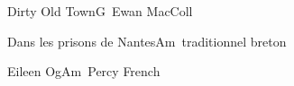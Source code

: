 \begin{song}{Dirty Old Town}{G}{~}{Ewan MacColl}{}{}
	
\end{song}

\begin{song}{Dans les prisons de Nantes}{Am}{~}{traditionnel breton}{}{}
	
\end{song}

\begin{song}{Eileen Og}{Am}{~}{Percy French}{}{}
	
\end{song}